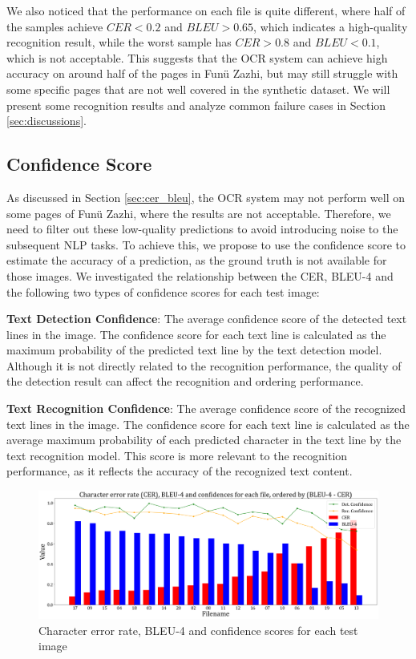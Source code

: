 \documentclass[12pt,twoside]{report}
\begin{document}
We also noticed that the performance on each file is quite different, where half of the samples achieve $CER<0.2$ and $BLEU>0.65$, which indicates a high-quality recognition result, while the worst sample has $CER>0.8$ and $BLEU<0.1$, which is not acceptable. This suggests that the OCR system can achieve high accuracy on around half of the pages in Funü Zazhi, but may still struggle with some specific pages that are not well covered in the synthetic dataset. We will present some recognition results and analyze common failure cases in Section \ref{sec:discussions}.

\subsection{Confidence Score}
\label{sec:confidence_score}
As discussed in Section \ref{sec:cer_bleu}, the OCR system may not perform well on some pages of Funü Zazhi, where the results are not acceptable. Therefore, we need to filter out these low-quality predictions to avoid introducing noise to the subsequent NLP tasks. To achieve this, we propose to use the confidence score to estimate the accuracy of a prediction, as the ground truth is not available for those images. We investigated the relationship between the CER, BLEU-4 and the following two types of confidence scores for each test image:

\textbf{Text Detection Confidence}: The average confidence score of the detected text lines in the image. The confidence score for each text line is calculated as the maximum probability of the predicted text line by the text detection model. Although it is not directly related to the recognition performance, the quality of the detection result can affect the recognition and ordering performance.

\textbf{Text Recognition Confidence}: The average confidence score of the recognized text lines in the image. The confidence score for each text line is calculated as the average maximum probability of each predicted character in the text line by the text recognition model. This score is more relevant to the recognition performance, as it reflects the accuracy of the recognized text content.

\begin{figure}[htbp]
    \centering
    \includegraphics[width=\textwidth]{./figures/cer_bleu_conf.png}
    \caption{Character error rate, BLEU-4 and confidence scores for each test image}
    \label{fig:cer_bleu_conf}
\end{figure}
\end{document}
